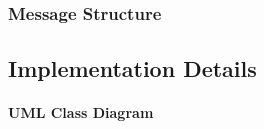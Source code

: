\subsubsection{Message Structure}

\subsection{Implementation Details}
\paragraph{UML Class Diagram}
